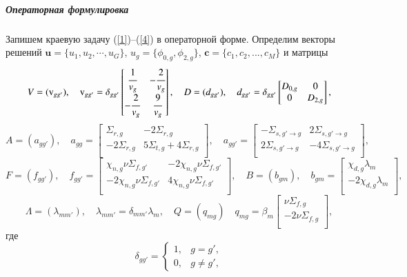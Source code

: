 \documentclass{crm-article}
\begin{document}
\subparagraph{Операторная формулировка}
Запишем краевую задачу (\ref{1})--(\ref{4}) в операторной форме. 
Определим векторы решений $\bm u = \{u_1, u_2, \cdots, u_G\}$, $u_g = \{\phi_{0,g}, \phi_{2,g}\}$, $\bm c = \{c_1, c_2, ..., c_M\}$ и матрицы
\[
V = (\mathrm{v}_{gg'}),
\quad
\mathrm{v}_{gg'} =\delta_{gg'} \begin{bmatrix}
\cfrac{1}{v_g} & -\cfrac{2}{v_g} \\
-\cfrac{2}{v_g} & \cfrac{9}{v_g} \\
\end{bmatrix},
\quad
D = (d_{gg'}),
\quad
d_{gg'} = \delta_{gg'} \begin{bmatrix}
D_{0,g} & 0 \\
0 & D_{2,g} \\
\end{bmatrix},
\]
\[
A = (a_{gg'}),
\quad
a_{gg} = \begin{bmatrix}
\Sigma_{r,g} &  -2\Sigma_{r,g} \\
-2\Sigma_{r,g} & 5\Sigma_{t,g} + 4\Sigma_{r,g} \\
\end{bmatrix},
\quad
a_{gg'} = \begin{bmatrix}
-\Sigma_{s, g'\rightarrow g} & 2\Sigma_{s, g'\rightarrow g} \\
2\Sigma_{s, g'\rightarrow g} & -4\Sigma_{s, g'\rightarrow g} \\
\end{bmatrix},
\]
\[
F = (f_{gg'}),
\quad
f_{gg'} = \begin{bmatrix}
\chi_{n,g}\nu\Sigma_{f,g'} & -2\chi_{n,g}\nu\Sigma_{f,g'} \\
-2\chi_{n,g}\nu\Sigma_{f,g'} & 4\chi_{n,g}\nu\Sigma_{f,g'} \\
\end{bmatrix},
\quad
B =(b_{gm}),
\quad
b_{gm} = \begin{bmatrix}
\chi_{d,g}\lambda_m\\
-2\chi_{d,g}\lambda_m\\
\end{bmatrix},
\]
\[
\Lambda = (\lambda_{mm'}), 
\quad
\lambda_{mm'} = \delta_{mm'}\lambda_m,
\quad
Q = (q_{mg})
\quad
q_{mg} =\beta_m \begin{bmatrix}
\nu\Sigma_{f,g} \\
-2\nu\Sigma_{f,g} \\
\end{bmatrix},
\]
где
\[
 \delta_{g g'} = \left \{ 
 \begin{matrix}
 1, & g = g', \\
 0, & g \neq  g',
 \end{matrix}
 \right. 
\] 
\end{document}

